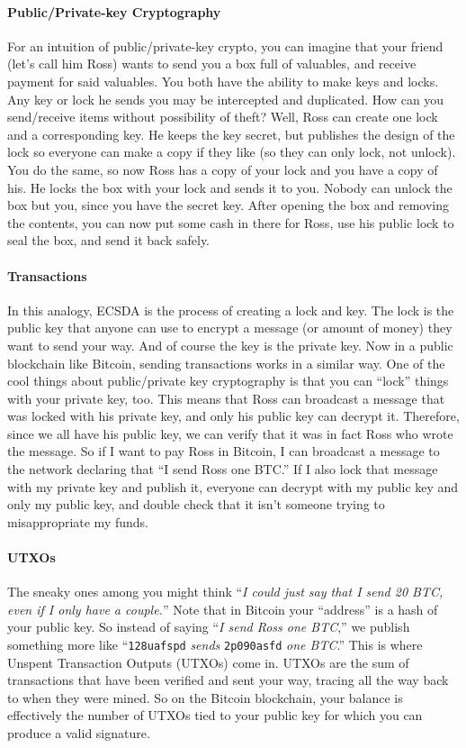 \documentclass[12pt]{article}
\begin{document}
\paragraph{Public/Private-key Cryptography} For an intuition of public/private-key crypto, you can imagine that your friend (let's call him Ross) wants to send you a box full of valuables, and receive payment for said valuables. You both have the ability to make keys and locks. Any key or lock he sends you may be intercepted and duplicated. How can you send/receive items without possibility of theft? Well, Ross can create one lock and a corresponding key. He keeps the key secret, but publishes the design of the lock so everyone can make a copy if they like (so they can only lock, not unlock). You do the same, so now Ross has a copy of your lock and you have a copy of his. He locks the box with your lock and sends it to you. Nobody can unlock the box but you, since you have the secret key. After opening the box and removing the contents, you can now put some cash in there for Ross, use his public lock to seal the box, and send it back safely.

\paragraph{Transactions} In this analogy, ECSDA is the process of creating a lock and key. The lock is the public key that anyone can use to encrypt a message (or amount of money) they want to send your way. And of course the key is the private key. Now in a public blockchain like Bitcoin, sending transactions works in a similar way. One of the cool things about public/private key cryptography is that you can ``lock'' things with your private key, too. This means that Ross can broadcast a message that was locked with his private key, and only his public key can decrypt it. Therefore, since we all have his public key, we can verify that it was in fact Ross who wrote the message. So if I want to pay Ross in Bitcoin, I can broadcast a message to the network declaring that ``I send Ross one BTC.'' If I also lock that message with my private key and publish it, everyone can decrypt with my public key and only my public key, and double check that it isn't someone trying to misappropriate my funds. 

\paragraph{UTXOs} The sneaky ones among you might think ``\emph{I could just say that I send 20 BTC, even if I only have a couple.}'' Note that in Bitcoin your ``address'' is a hash of your public key. So instead of saying ``\emph{I send Ross one BTC},'' we publish something 
more like ``\texttt{128uafspd} \emph{sends} \texttt{2p090asfd} \emph{one BTC}.'' This is where Unspent Transaction Outputs (UTXOs) come in. UTXOs are the sum of transactions that have been verified and sent your way, tracing all the way back to when they were mined. So on the Bitcoin blockchain, your balance is effectively the number of UTXOs tied to your public key for which you can produce a valid signature. 
\end{document}
